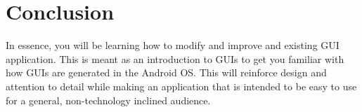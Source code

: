 \section{Conclusion}

In essence, you will be learning how to modify and improve and existing GUI application.  This is meant as an introduction to GUIs to get you familiar with how GUIs are generated in the Android OS. This will reinforce design and attention to detail while making an application that is intended to be easy to use for a general, non-technology inclined audience.
